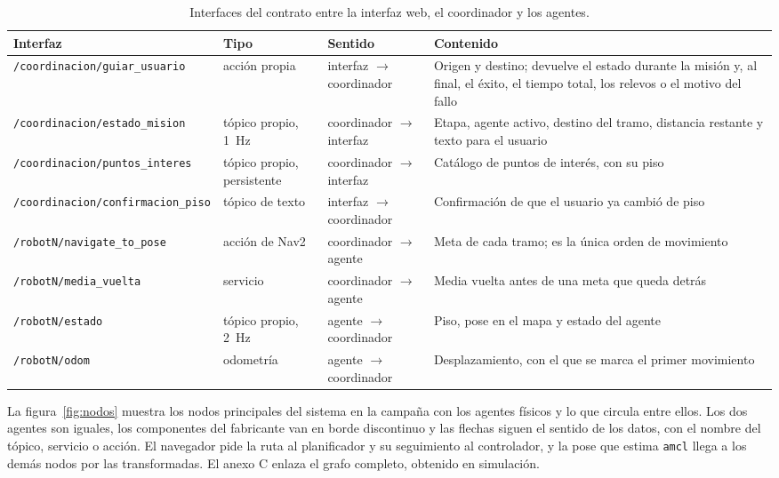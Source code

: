 \begin{table}[H]
  \centering\footnotesize
  \caption{Interfaces del contrato entre la interfaz web, el coordinador y los agentes.}
  \label{tab:contrato}
  \begin{tabular}{@{}p{}p{}p{}p{}@{}}
    \toprule
    \textbf{Interfaz} & \textbf{Tipo} & \textbf{Sentido} & \textbf{Contenido} \\ \midrule
    \texttt{/coordinacion/guiar\_usuario} & acción propia & interfaz $\rightarrow$ coordinador & Origen y destino; devuelve el estado durante la misión y, al final, el éxito, el tiempo total, los relevos o el motivo del fallo \\ \addlinespace
    \texttt{/coordinacion/estado\_mision} & tópico propio, 1~Hz & coordinador $\rightarrow$ interfaz & Etapa, agente activo, destino del tramo, distancia restante y texto para el usuario \\ \addlinespace
    \texttt{/coordinacion/puntos\_interes} & tópico propio, persistente & coordinador $\rightarrow$ interfaz & Catálogo de puntos de interés, con su piso \\ \addlinespace
    \texttt{/coordinacion/confirmacion\_piso} & tópico de texto & interfaz $\rightarrow$ coordinador & Confirmación de que el usuario ya cambió de piso \\ \addlinespace
    \texttt{/robotN/navigate\_to\_pose} & acción de Nav2 & coordinador $\rightarrow$ agente & Meta de cada tramo; es la única orden de movimiento \\ \addlinespace
    \texttt{/robotN/media\_vuelta} & servicio & coordinador $\rightarrow$ agente & Media vuelta antes de una meta que queda detrás \\ \addlinespace
    \texttt{/robotN/estado} & tópico propio, 2~Hz & agente $\rightarrow$ coordinador & Piso, pose en el mapa y estado del agente \\ \addlinespace
    \texttt{/robotN/odom} & odometría & agente $\rightarrow$ coordinador & Desplazamiento, con el que se marca el primer movimiento \\ \bottomrule
  \end{tabular}
\end{table}

La figura~\ref{fig:nodos} muestra los nodos principales del sistema en la campaña con los agentes físicos y lo que circula entre ellos. Los dos agentes son iguales, los componentes del fabricante van en borde discontinuo y las flechas siguen el sentido de los datos, con el nombre del tópico, servicio o acción. El navegador pide la ruta al planificador y su seguimiento al controlador, y la pose que estima \texttt{amcl} llega a los demás nodos por las transformadas. El anexo C enlaza el grafo completo, obtenido en simulación.


